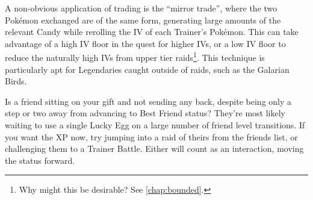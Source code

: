 A non-obvious application of trading is the ``mirror trade'', where the
 two Pokémon exchanged are of the same form, generating large amounts
 of the relevant Candy while rerolling the IV of each Trainer's Pokémon.
This can take advantage of a high IV floor in the quest for higher IVs, or
 a low IV floor to reduce the naturally high IVs from upper tier raids\footnote{Why might this be desirable? See \autoref{chap:bounded}.}.
This technique is particularly apt for Legendaries caught outside of raids,
 such as the Galarian Birds.

\begin{tipbox}[title=Moving a friendship forward]
Is a friend sitting on your gift and not sending any back, despite being only a step
 or two away from advancing to Best Friend status?
They're most likely waiting to use a single Lucky Egg on a large number of
 friend level transitions.
If you want the XP now, try jumping into a raid of theirs from the friends list, or challenging them to a Trainer Battle.
Either will count as an interaction, moving the status forward.
\end{tipbox}

